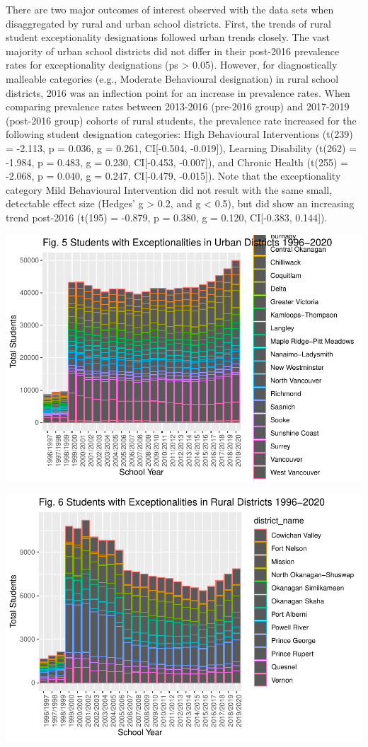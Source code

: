 \documentclass[
  english,
  man,floatsintext]{apa6}
\begin{document}
There are two major outcomes of interest observed with the data sets when disaggregated by rural and urban school districts. First, the trends of rural student exceptionality designations followed urban trends closely. The vast majority of urban school districts did not differ in their post-2016 prevalence rates for exceptionality designations (ps \textgreater{} 0.05). However, for diagnostically malleable categories (e.g., Moderate Behavioural designation) in rural school districts, 2016 was an inflection point for an increase in prevalence rates. When comparing prevalence rates between 2013-2016 (pre-2016 group) and 2017-2019 (post-2016 group) cohorts of rural students, the prevalence rate increased for the following student designation categories: High Behavioural Interventions (t(239) = -2.113, p = 0.036, g = 0.261, CI{[}-0.504, -0.019{]}), Learning Disability (t(262) = -1.984, p = 0.483, g = 0.230, CI{[}-0.453, -0.007{]}), and Chronic Health (t(255) = -2.068, p = 0.040, g = 0.247, CI{[}-0.479, -0.015{]}). Note that the exceptionality category Mild Behavioural Intervention did not result with the same small, detectable effect size (Hedges' g \textgreater{} 0.2, and g \textless{} 0.5), but did show an increasing trend post-2016 (t(195) = -0.879, p = 0.380, g = 0.120, CI{[}-0.383, 0.144{]}).

\includegraphics{Final_project_files/figure-latex/rainbow figure urban-1.pdf}

\includegraphics{Final_project_files/figure-latex/rainbow figure rural-1.pdf}
\end{document}
